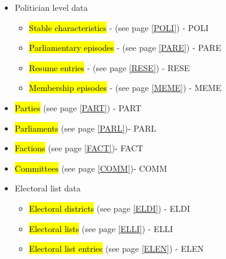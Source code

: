 \documentclass{article}
\begin{document}
   \begin{itemize}
    
    
    \item Politician level data
    
         \begin{itemize}
            \item \hl{Stable characteristics} - (see page \ref{POLI}) - POLI
            \item \hl{Parliamentary episodes} - (see page \ref{PARE}) - PARE
            \item \hl{Resume entries} - (see page \ref{RESE}) - RESE
            \item \hl{Membership episodes} - (see page \ref{MEME}) - MEME
            
         \end{itemize}
    
    \item \hl{Parties} (see page \ref{PART}) - PART
    
    \item \hl{Parliaments} (see page \ref{PARL})- PARL
    
    \item \hl{Factions} (see page \ref{FACT})- FACT
    
    \item \hl{Committees} (see page \ref{COMM})- COMM
    
    \item Electoral list data
        
        \begin{itemize}
        
            \item \hl{Electoral districts} (see page \ref{ELDI}) - ELDI
            
            \item \hl{Electoral lists} (see page \ref{ELLI}) - ELLI
            
            \item \hl{Electoral list entries} (see page \ref{ELEN}) - ELEN
                
        
        \end{itemize}

    \end{itemize}
    
\end{document}
